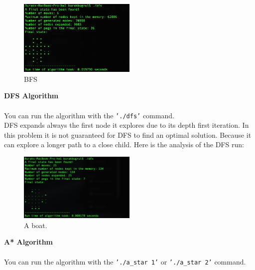 \documentclass[11pt]{article}
\renewcommand\part[1]{\vspace{.10in}\textbf{#1}}
\begin{document}
	\begin{figure}[h!]
		\centering
		\includegraphics[width=0.5\textwidth]{images/bfs.png}
		\caption{BFS}
		\label{fig:BFS}
	\end{figure}

	\cleardoublepage

	\part{DFS Algorithm} \\ \ \\
	
	You can run the algorithm with the \texttt{'./dfs'} command.\\
	
	DFS expands always the first node it explores due to its depth first iteration. In this problem it is not guaranteed for DFS to find an optimal solution. Because it can explore a longer path to a close child. Here is the analysis of the DFS run:
	
	\begin{figure}[h!]
		\centering
		\includegraphics[width=0.5\textwidth]{images/dfs.png}
		\caption{A boat.}
		\label{fig:DFS}
	\end{figure}	

	\part{A* Algorithm} \\ \ \\
	
	You can run the algorithm with the \texttt{'./a\_star 1'} or \texttt{'./a\_star 2'} command.\\
	
\end{document}
